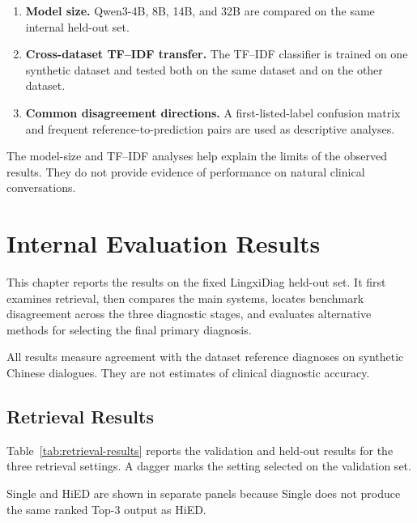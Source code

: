 \documentclass[12pt,a4paper,oneside]{report}
\begin{document}
\begin{enumerate}
    \item \textbf{Model size.}
    Qwen3-4B, 8B, 14B, and 32B are compared on the same internal
    held-out set.

    \item \textbf{Cross-dataset TF--IDF transfer.}
    The TF--IDF classifier is trained on one synthetic dataset and tested
    both on the same dataset and on the other dataset.

    \item \textbf{Common disagreement directions.}
    A first-listed-label confusion matrix and frequent
    reference-to-prediction pairs are used as descriptive analyses.
\end{enumerate}

The model-size and TF--IDF analyses help explain the limits of the
observed results. They do not provide evidence of performance on natural
clinical conversations.



\chapter{Internal Evaluation Results}
\label{ch:results}

This chapter reports the results on the fixed LingxiDiag held-out set.
It first examines retrieval, then compares the main systems, locates
benchmark disagreement across the three diagnostic stages, and evaluates
alternative methods for selecting the final primary diagnosis.

All results measure agreement with the dataset reference diagnoses on
synthetic Chinese dialogues. They are not estimates of clinical
diagnostic accuracy.

\section{Retrieval Results}
\label{sec:retrieval-results}

Table~\ref{tab:retrieval-results} reports the validation and held-out
results for the three retrieval settings. A dagger marks the setting
selected on the validation set.

Single and HiED are shown in separate panels because Single does not
produce the same ranked Top-3 output as HiED.
\end{document}
